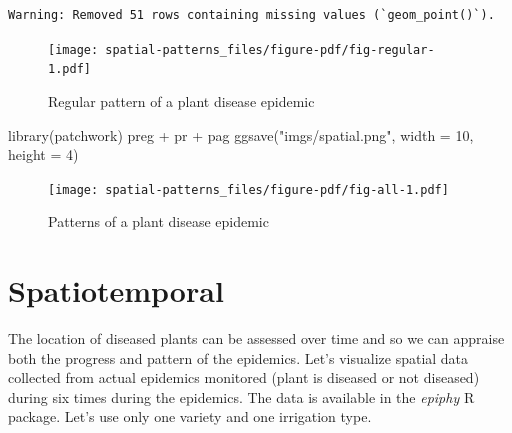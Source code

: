 \documentclass[
  letterpaper,
]{book}
\newenvironment{Shaded}{\begin{snugshade}}{\end{snugshade}}
\newcommand{\AttributeTok}[1]{\textcolor[rgb]{0.40,0.45,0.13}{#1}}
\newcommand{\DecValTok}[1]{\textcolor[rgb]{0.68,0.00,0.00}{#1}}
\newcommand{\FunctionTok}[1]{\textcolor[rgb]{0.28,0.35,0.67}{#1}}
\newcommand{\NormalTok}[1]{\textcolor[rgb]{0.00,0.23,0.31}{#1}}
\newcommand{\SpecialCharTok}[1]{\textcolor[rgb]{0.37,0.37,0.37}{#1}}
\newcommand{\StringTok}[1]{\textcolor[rgb]{0.13,0.47,0.30}{#1}}
\begin{document}
\begin{verbatim}
Warning: Removed 51 rows containing missing values (`geom_point()`).
\end{verbatim}

\begin{figure}[H]

{\centering \texttt{[image: spatial-patterns\_files/figure-pdf/fig-regular-1.pdf]}

}

\caption{\label{fig-regular}Regular pattern of a plant disease epidemic}

\end{figure}

\begin{Shaded}
\begin{Highlighting}[]
\FunctionTok{library}\NormalTok{(patchwork)}
\NormalTok{preg }\SpecialCharTok{+}\NormalTok{ pr }\SpecialCharTok{+}\NormalTok{ pag}
\FunctionTok{ggsave}\NormalTok{(}\StringTok{"imgs/spatial.png"}\NormalTok{, }\AttributeTok{width =} \DecValTok{10}\NormalTok{, }\AttributeTok{height =} \DecValTok{4}\NormalTok{)}
\end{Highlighting}
\end{Shaded}

\begin{figure}[H]

{\centering \texttt{[image: spatial-patterns\_files/figure-pdf/fig-all-1.pdf]}

}

\caption{\label{fig-all}Patterns of a plant disease epidemic}

\end{figure}

\hypertarget{spatiotemporal}{%
\section{Spatiotemporal}\label{spatiotemporal}}

The location of diseased plants can be assessed over time and so we can
appraise both the progress and pattern of the epidemics. Let's visualize
spatial data collected from actual epidemics monitored (plant is
diseased or not diseased) during six times during the epidemics. The
data is available in the \emph{epiphy} R package. Let's use only one
variety and one irrigation type.
\end{document}
